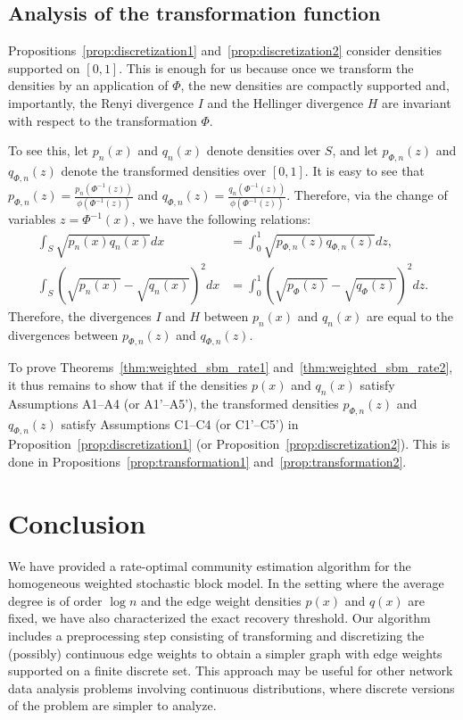 \documentclass{article}
\begin{document}
\subsection{Analysis of the transformation function}
\label{sec:transformation_analysis}

Propositions~\ref{prop:discretization1} and~\ref{prop:discretization2} consider densities supported on $[0,1]$. This is enough for us because once we transform the densities by an application of $\Phi$, the new densities are compactly supported and, importantly, the Renyi divergence $I$ and the Hellinger divergence $H$ are invariant with respect to the transformation $\Phi$.

To see this, let $p_n(x)$ and $q_n(x)$ denote densities over $S$, and let $p_{\Phi,n}(z)$ and $q_{\Phi,n}(z)$ denote the transformed densities over $[0,1]$. It is easy to see that $p_{\Phi,n}(z) = \frac{p_n(\Phi^{-1}(z))}{\phi(\Phi^{-1}(z))}$ and $q_{\Phi,n}(z) = \frac{q_n(\Phi^{-1}(z))}{\phi(\Phi^{-1}(z))}$. Therefore, via the change of variables $z = \Phi^{-1}(x)$, we have the following relations:
\begin{align*}
\int_S \sqrt{p_n(x)q_n(x)} dx &= \int_0^1 \sqrt{p_{\Phi,n}(z) q_{\Phi,n}(z)} dz, \\
\int_S \left(\sqrt{p_n(x)} - \sqrt{q_n(x)}\right)^2 dx &= \int_0^1 \left(\sqrt{p_{\Phi}(z)} -\sqrt{q_{\Phi}(z)}\right)^2 dz.
\end{align*}
Therefore, the divergences $I$ and $H$ between $p_n(x)$ and $q_n(x)$ are equal to the divergences between $p_{\Phi,n}(z)$ and $q_{\Phi,n}(z)$.

To prove Theorems~\ref{thm:weighted_sbm_rate1} and~\ref{thm:weighted_sbm_rate2}, it thus remains to show that if the densities $p(x)$ and $q_n(x)$ satisfy Assumptions A1--A4 (or A1'--A5'), the transformed densities $p_{\Phi,n}(z)$ and $q_{\Phi,n}(z)$ satisfy Assumptions C1--C4 (or C1'--C5') in Proposition~\ref{prop:discretization1} (or Proposition~\ref{prop:discretization2}). This is done in Propositions~\ref{prop:transformation1} and~\ref{prop:transformation2}.


\section{Conclusion}
\label{sec:conclusion}

We have provided a rate-optimal community estimation algorithm for the homogeneous weighted stochastic block model. In the setting where the average degree is of order $\log n$ and the edge weight densities $p(x)$ and $q(x)$ are fixed, we have also characterized the exact recovery threshold. Our algorithm includes a preprocessing step consisting of transforming and discretizing the (possibly) continuous edge weights to obtain a simpler graph with edge weights supported on a finite discrete set. This approach may be useful for other network data analysis problems involving continuous distributions, where discrete versions of the problem are simpler to analyze.
\end{document}
